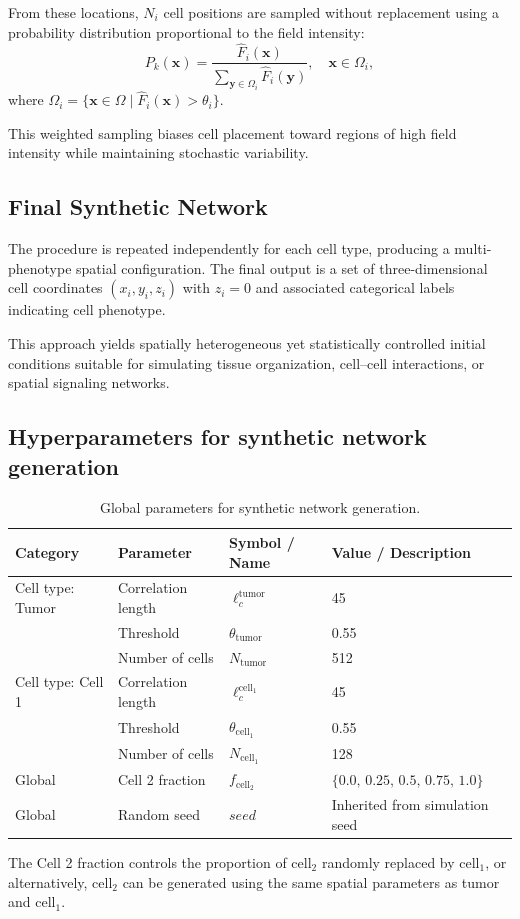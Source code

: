 \documentclass{article}
\begin{document}
From these locations, $N_i$ cell positions are sampled without replacement using a probability distribution proportional to the field intensity:
$$
P_k(\mathbf{x}) =
\frac{\hat{F}_i(\mathbf{x})}
{\sum_{\mathbf{y} \in \Omega_i} \hat{F}_i(\mathbf{y})},
\quad \mathbf{x} \in \Omega_i,
$$
where $\Omega_i = \{\mathbf{x} \in \Omega \mid \hat{F}_i(\mathbf{x}) > \theta_i\}$.

This weighted sampling biases cell placement toward regions of high field intensity while maintaining stochastic variability.

\subsection{Final Synthetic Network}

The procedure is repeated independently for each cell type, producing a multi-phenotype spatial configuration. The final output is a set of three-dimensional cell coordinates $(x_i, y_i, z_i)$ with $z_i = 0$ and associated categorical labels indicating cell phenotype.

This approach yields spatially heterogeneous yet statistically controlled initial conditions suitable for simulating tissue organization, cell–cell interactions, or spatial signaling networks.
\subsection{Hyperparameters for synthetic network generation}
\begin{table}[htbp]
\centering
\caption{Global parameters for synthetic network generation.}
\label{tab:global_generation_params}
\begin{tabular}{llll}
\hline
\textbf{Category} & \textbf{Parameter} & \textbf{Symbol / Name} & \textbf{Value / Description} \\
\hline
{Cell type: Tumor}
& Correlation length & $\ell_c^{\text{tumor}}$ & 45 \\
& Threshold & $\theta_{\text{tumor}}$ & 0.55 \\
& Number of cells & $N_{\text{tumor}}$ & 512\\
\hline
{Cell type: Cell 1}
& Correlation length & $\ell_c^{\text{cell}_1}$ & 45 \\
& Threshold & $\theta_{\text{cell}_1}$ & 0.55 \\
& Number of cells & $N_{\text{cell}_1}$ & 128 \\
\hline
Global
& Cell 2 fraction & $f_{\text{cell}_2}$ & $\{0.0,\,0.25,\,0.5,\,0.75,\,1.0\}$ \\
Global
& Random seed & $seed$ & Inherited from simulation seed \\
\hline
\end{tabular}
\end{table}
The Cell 2 fraction controls the proportion of cell$_2$ randomly replaced by cell$_1$, or alternatively, cell$_2$ can be generated using the same spatial parameters as tumor and cell$_1$.
\end{document}
